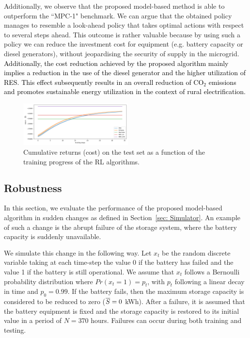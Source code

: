 \documentclass{article}
\begin{document}
Additionally, we observe that the proposed model-based method is able to outperform the ``MPC-1" benchmark. We can argue that the obtained policy manages to resemble a look-ahead policy that takes optimal actions with respect to several steps ahead. This outcome is rather valuable because by using such a policy we can reduce the investment cost for equipment (e.g. battery capacity or diesel generators), without jeopardising the security of supply in the microgrid. \textcolor{black}{Additionally, the cost reduction achieved by the proposed algorithm mainly implies a reduction in the use of the diesel generator and the higher utilization of RES. This effect subsequently results in an overall reduction of CO$_2$ emissions and promotes sustainable energy utilization in the context of rural electrification.}

\begin{figure}[t]
	\includegraphics[width=0.51\textwidth]{MicroGrid-Long-v0.png}
	\centering
	\caption{Cumulative returns (cost) on the test set as a function of the training progress of the RL algorithms.}
	\label{fig:rl-results}
\end{figure}

\subsection{Robustness} \label{sec: robustness}

In this section, we evaluate the performance of the proposed model-based algorithm in sudden changes as defined in Section~\ref{sec: Simulator}. An example of such a change is the abrupt failure of the storage system, where the battery capacity is suddenly unavailable. 

We simulate this change in the following way. Let $x_{t}$ be the random discrete variable taking at each time-step the value 0 if the battery has failed and the value 1 if the battery is still operational. We assume that $x_{t}$ follows a Bernoulli probability distribution where $Pr(x_{t}=1)=p_{t}$, with $p_{t}$ following a linear decay in time and $p_{0}= 0.99$. If the battery fails, then the maximum storage capacity is considered to be reduced to zero ($\overline{S}=0 $ kWh). After a failure, it is assumed that the battery equipment is fixed and the storage capacity is restored to its initial value in a period of $N=370$ hours. Failures can occur during both training and testing.
\end{document}
